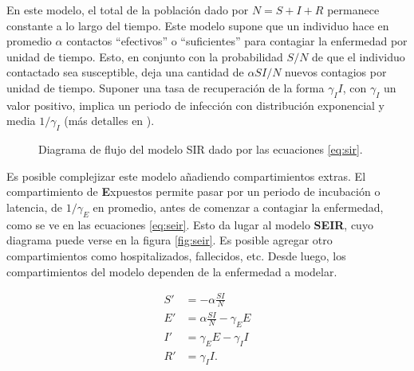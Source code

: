 En este modelo, el total de la población dado por \(N = S + I + R\) permanece constante a lo largo del tiempo. Este modelo supone que un individuo hace en promedio \(\alpha\) contactos  ``efectivos'' o ``suficientes'' para contagiar la enfermedad por unidad de tiempo. Esto, en conjunto con la probabilidad \(S/N\) de que el individuo contactado sea susceptible, deja una cantidad de \(\alpha S I / N\) nuevos contagios por unidad de tiempo. Suponer una tasa de recuperación de la forma \(\gamma_I I\), con \(\gamma_I\) un valor positivo, implica un periodo de infección con distribución exponencial y media \(1/\gamma_I\) (más detalles en \cite{Brauer2019}).




\begin{figure}[!h]
\centering
{}

\caption{Diagrama de flujo del modelo SIR dado por las ecuaciones \ref{eq:sir}.} \label{fig:sir}
\end{figure}



Es posible complejizar este modelo añadiendo compartimientos extras. El compartimiento de \textbf{E}xpuestos permite pasar por un periodo de incubación o latencia, de \(1/\gamma_E\) en promedio, antes de comenzar a contagiar la enfermedad, como se ve en las ecuaciones \ref{eq:seir}. Esto da lugar al modelo \textbf{SEIR}, cuyo diagrama puede verse en la figura \ref{fig:seir}. Es posible agregar otro compartimientos como hospitalizados, fallecidos, etc. Desde luego, los compartimientos del modelo dependen de la enfermedad a modelar.


\begin{equation}
\label{eq:seir}
\begin{aligned}
S' &=  -\alpha \frac{SI}{N} \\
E' &= \alpha \frac{SI}{N} - \gamma_E E \\
I' &= \gamma_E E - \gamma_I I \\
R' &= \gamma_I I.
\end{aligned}
\end{equation}


